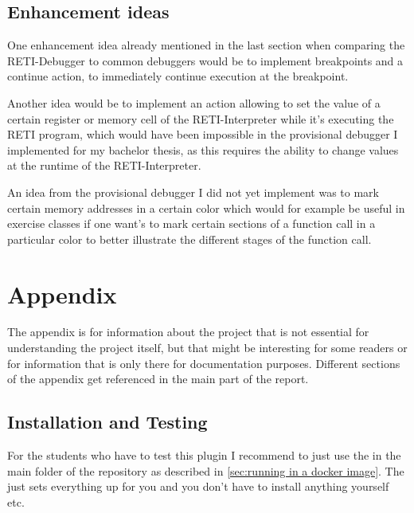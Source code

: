 \documentclass{report}
\begin{document}
\section{Enhancement ideas}
\label{sec:enhancement ideas}

One enhancement idea already mentioned in the last section when comparing the RETI-Debugger to common debuggers would be to implement breakpoints and a continue action, to immediately continue execution at the breakpoint.

Another idea would be to implement an action  allowing to set the value of a certain register or memory cell of the RETI-Interpreter while it's executing the RETI program, which would have been impossible in the provisional debugger I implemented for my bachelor thesis, as this requires the ability to change values at the runtime of the RETI-Interpreter.

An idea from the provisional debugger I did not yet implement was to mark certain memory addresses in a certain color which would for example be useful in exercise classes if one want's to mark certain sections of a function call in a particular color to better illustrate the different stages of the function call.

\clearpage
\chapter{Appendix}

The appendix is for information about the project that is not essential for understanding the project itself, but that might be interesting for some readers or for information that is only there for documentation purposes. Different sections of the appendix get referenced in the main part of the report.%

\section{Installation and Testing}
\label{sec:installation and testing}

For the students who have to test this plugin I recommend to just use the  in the main folder of the repository as described in \ref{sec:running in a docker image}. The  just sets everything up for you and you don't have to install anything yourself etc.
\end{document}
